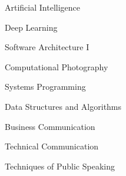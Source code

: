 \vspace{-.2cm}

\begin{cvparagraph}
\vspace{1.5mm}
\begin{minipage}{.35\linewidth}
    \begin{cvitems}
        \item{Artificial Intelligence}
        \item{Deep Learning}
        \item{Software Architecture I}
    \end{cvitems}
\end{minipage}%
\begin{minipage}{.35\linewidth}
    \begin{cvitems}
        \item{Computational Photography}
        \item{Systems Programming}
        \item{Data Structures and Algorithms}
    \end{cvitems}
\end{minipage}%
\begin{minipage}{.35\linewidth}
    \begin{cvitems}
        \item{Business Communication}
        \item{Technical Communication}
        \item{Techniques of Public Speaking}
    \end{cvitems}
  
\end{minipage}%
\vspace{.4cm}
\end{cvparagraph}